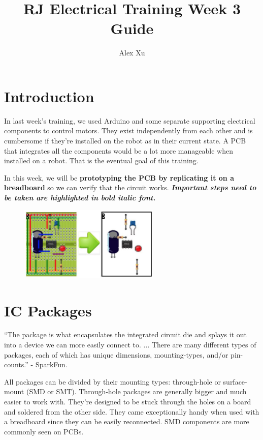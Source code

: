 \documentclass{article}
\title{RJ Electrical Training Week 3 Guide}
\author{Alex Xu}
\begin{document}
\maketitle{}
\setcounter{tocdepth}{2}
\tableofcontents
\pagebreak

\section{Introduction}
In last week's training, we used Arduino and some separate supporting electrical components to control motors. They exist independently from each other and is cumbersome if they're installed on the robot as in their current state. A PCB that integrates all the components would be a lot more manageable when installed on a robot. That is the eventual goal of this training. \par
In this week, we will be \textbf{prototyping the PCB by replicating it on a breadboard} so we can verify that the circuit works. \textbf{\emph{Important steps need to be taken are highlighted in bold italic font.}}

\begin{figure}[!h]
    \center
    \includegraphics[width=0.6\textwidth,height=0.6\textheight,keepaspectratio]{breadboard_to_pcb}
\end{figure}

\section{IC Packages}
``The package is what encapsulates the integrated circuit die and splays it out into a device we can more easily connect to. ... There are many different types of packages, each of which has unique dimensions, mounting-types, and/or pin-counts.''  - SparkFun. \par
All packages can be divided by their mounting types: through-hole or surface-mount (SMD or SMT). Through-hole packages are generally bigger and much easier to work with. They're designed to be stuck through the holes on a board and soldered from the other side. They came exceptionally handy when used with a breadboard since they can be easily reconnected. SMD components are more commonly seen on PCBs.
\end{document}
